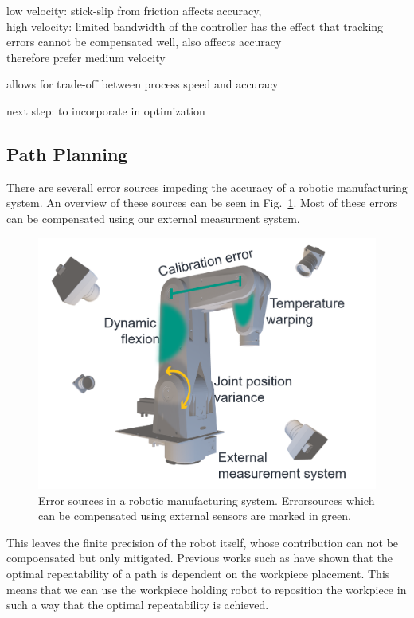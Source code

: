 \documentclass[5p,times,procedia]{elsarticle}
\begin{document}
low velocity: stick-slip from friction affects accuracy,\\
high velocity: limited bandwidth of the controller has the effect that tracking errors cannot be compensated well, also affects accuracy \\
therefore prefer medium velocity

allows for trade-off between process speed and accuracy

next step: to incorporate in optimization


\subsection{Path Planning}
There are severall error sources impeding the accuracy of a robotic manufacturing system.
An overview of these sources can be seen in Fig.~\ref{fig:error_sources}.
Most of these errors can be compensated using our external measurment system.
\begin{figure}[h]
\centering
\includegraphics[width=\columnwidth]{graphics/error_sources.png}
\caption{Error sources in a robotic manufacturing system. Errorsources which can be compensated using external sensors are marked in green.}
\label{fig:error_sources}
\end{figure}
This leaves the finite precision of the robot itself, whose contribution can not be compoensated but only mitigated.
Previous works such as \cite{previous_work} have shown that the optimal repeatability of a path is dependent on the workpiece placement.
This means that we can use the workpiece holding robot to reposition the workpiece in such a way that the optimal repeatability is achieved.
\end{document}
